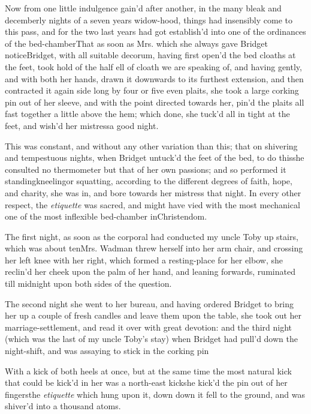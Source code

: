 \documentclass{article}
\begin{document}
Now from one little indulgence gain’d after another, in the many
bleak and decemberly nights of a seven years widow-hood, things
had insensibly come to this pass, and for the two last years had
got establish’d into one of the ordinances of the
bed-chamber\tsk That as soon as Mrs.\@ 
{}
which she always gave Bridget notice\tsk Bridget, with all
suitable decorum, having first open’d the bed cloaths at the
feet, took hold of the half ell of cloath we are speaking of,
and having gently, and with both her hands, drawn it
downwards to its furthest extension, and then contracted it
again side long by four or five even plaits, she took a large
corking pin out of her sleeve, and with the point directed
towards her, pin’d the plaits all fast together a little above
the hem; which done, she tuck’d all in tight at the feet, and
wish’d her mistress\break a good night.

This was constant, and without any other variation than this;
that on shivering and tempestuous nights, when Bridget
untuck’d the feet of the bed, \etc to do
this\tsk she consulted no thermometer but that of her own
passions; and so performed it standing\tsk kneeling\break\tsk or
squatting, according to the different degrees of faith, hope, and
charity, she was in, and bore towards her mistress that night. In
every other respect, the \textit{etiquette} was sacred, and might
have vied with the most mechanical one of the most inflexible
bed-chamber in\break Christendom.

The first night, as soon as the corporal had conducted my uncle
Toby up stairs, which was about ten\tsh Mrs.\break
Wadman threw herself into her arm chair, and crossing her
left knee with her right, which formed a resting-place for her
elbow, she reclin’d her cheek upon the palm of her hand, and
leaning forwards, ruminated till midnight upon both sides of
the question.

The second night she went to her bureau, and having ordered
Bridget to bring her up a couple of fresh candles and leave
them upon the table, she took out her marriage-settlement, and read
it over with great devotion: and the third night (which was the
last of my uncle Toby’s stay) when Bridget had
pull’d down the night-shift, and was assaying to stick in the
corking pin\tsh

\tsh With a kick of both heels at once, but at the same
time the most natural kick that could be kick’d in her
was a north-east kick\tsh she kick’d the pin out of her
fingers\tsh the \textit{etiquette} which hung upon it, down\tsh
down it fell to the ground, and was shiver’d into a thousand
atoms.
\end{document}
